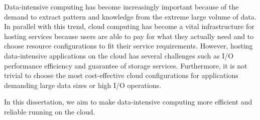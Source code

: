 

Data-intensive computing has become increasingly important
because of the demand to extract pattern and knowledge
from the extreme large volume of data.
In parallel with this trend, cloud computing has become
a vital infrastructure for hosting services
because users are able
to pay for what they actually need and
to choose resource configurations to fit their service requirements.
However, hosting data-intensive applications on the cloud
has several challenges such as
I/O performance efficiency and guarantee of storage services.
Furthermore, it is not trivial to choose the most cost-effective
cloud configurations for applications demanding
large data sizes or high I/O operations.

In this dissertation, we aim to make data-intensive computing more
efficient and reliable running on the cloud.


